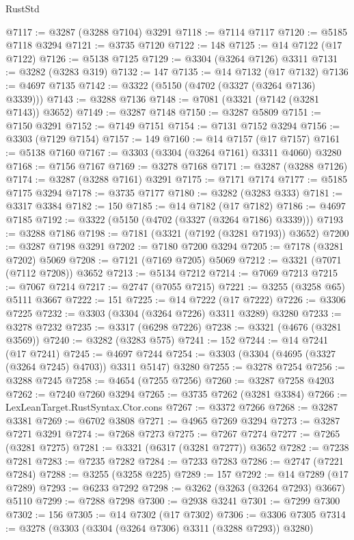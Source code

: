\begin{lexlean}{RustStd}
\begin{coremodule}
{\begin{coremodule}
{{{{{{{{{{{{{{{{{{{{{{{{{{{{{{{{{@7117 := @3287 (@3288 @7104) @3291
@7118 := @7114 @7117
@7120 := @5185 @7118 @3294
@7121 := @3735 @7120
@7122 := 148
@7125 := @14 @7122 (@17 @7122)
@7126 := @5138 @7125
@7129 := @3304 (@3264 @7126) @3311
@7131 := @3282 (@3283 @319)
@7132 := 147
@7135 := @14 @7132 (@17 @7132)
@7136 := @4697 @7135
@7142 := @3322 (@5150 (@4702 (@3327 (@3264 @7136) @3339)))
@7143 := @3288 @7136
@7148 := @7081 (@3321 (@7142 (@3281 @7143)) @3652)
@7149 := @3287 @7148
@7150 := @3287 @5809
@7151 := @7150 @3291
@7152 := @7149 @7151
@7154 := @7131 @7152 @3294
@7156 := @3303 (@7129 @7154)
@7157 := 149
@7160 := @14 @7157 (@17 @7157)
@7161 := @5138 @7160
@7167 := @3303 (@3304 (@3264 @7161) @3311 @4060) @3280
@7168 := @7156 @7167
@7169 := @3278 @7168
@7171 := @3287 (@3288 @7126)
@7174 := @3287 (@3288 @7161) @3291
@7175 := @7171 @7174
@7177 := @5185 @7175 @3294
@7178 := @3735 @7177
@7180 := @3282 (@3283 @333)
@7181 := @3317 @3384
@7182 := 150
@7185 := @14 @7182 (@17 @7182)
@7186 := @4697 @7185
@7192 := @3322 (@5150 (@4702 (@3327 (@3264 @7186) @3339)))
@7193 := @3288 @7186
@7198 := @7181 (@3321 (@7192 (@3281 @7193)) @3652)
@7200 := @3287 @7198 @3291
@7202 := @7180 @7200 @3294
@7205 := @7178 (@3281 @7202) @5069
@7208 := @7121 (@7169 @7205) @5069
@7212 := @3321 (@7071 (@7112 @7208)) @3652
@7213 := @5134 @7212
@7214 := @7069 @7213
@7215 := @7067 @7214
@7217 := @2747 (@7055 @7215)
@7221 := @3255 (@3258 @65) @5111 @3667
@7222 := 151
@7225 := @14 @7222 (@17 @7222)
@7226 := @3306 @7225
@7232 := @3303 (@3304 (@3264 @7226) @3311 @3289) @3280
@7233 := @3278 @7232
@7235 := @3317 (@6298 @7226)
@7238 := @3321 (@4676 (@3281 @3569))
@7240 := @3282 (@3283 @575)
@7241 := 152
@7244 := @14 @7241 (@17 @7241)
@7245 := @4697 @7244
@7254 := @3303 (@3304 (@4695 (@3327 (@3264 @7245) @4703)) @3311 @5147) @3280
@7255 := @3278 @7254
@7256 := @3288 @7245
@7258 := @4654 (@7255 @7256)
@7260 := @3287 @7258 @4203
@7262 := @7240 @7260 @3294
@7265 := @3735 @7262 (@3281 @3384)
@7266 := LexLeanTarget.RustSyntax.Ctor.cons
@7267 := @3372 @7266
@7268 := @3287 @3381
@7269 := @6702 @3808
@7271 := @4965 @7269 @3294
@7273 := @3287 @7271 @3291
@7274 := @7268 @7273
@7275 := @7267 @7274
@7277 := @7265 (@3281 @7275)
@7281 := @3321 (@6317 (@3281 @7277)) @3652
@7282 := @7238 @7281
@7283 := @7235 @7282
@7284 := @7233 @7283
@7286 := @2747 (@7221 @7284)
@7288 := @3255 (@3258 @225)
@7289 := 157
@7292 := @14 @7289 (@17 @7289)
@7293 := @6233 @7292
@7298 := @3262 (@3263 (@3264 @7293) @3667) @5110
@7299 := @7288 @7298
@7300 := @2938 @3241
@7301 := @7299 @7300
@7302 := 156
@7305 := @14 @7302 (@17 @7302)
@7306 := @3306 @7305
@7314 := @3278 (@3303 (@3304 (@3264 @7306) @3311 (@3288 @7293)) @3280)
}}}}}}}}}}}}}}}}}}}}}}}}}}}}}}}}}
\end{coremodule}}
\end{coremodule}
\end{lexlean}
